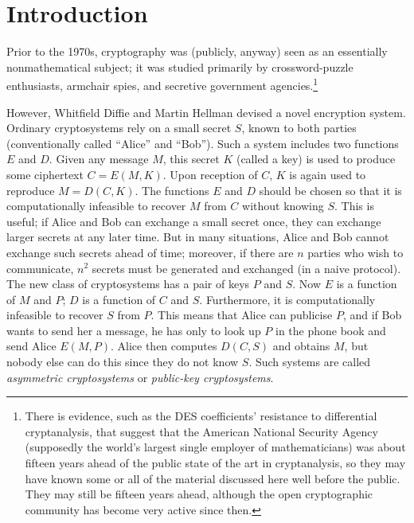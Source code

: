 \documentclass[12pt]{article}
\begin{document}
\section*{Introduction}

Prior to the 1970s, cryptography was (publicly, anyway) seen as an essentially nonmathematical subject; it was studied primarily by crossword-puzzle enthusiasts, armchair spies, and secretive government agencies.\footnote{There is evidence, such as the DES coefficients' resistance to differential cryptanalysis, that suggest that the American National Security Agency (supposedly the world's largest single employer of mathematicians) was about fifteen years ahead of the public state of the art in cryptanalysis, so they may have known some or all of the material discussed here well before the public.  They may still be fifteen years ahead, although the open cryptographic community has become very active since then.} 

However, Whitfield Diffie and Martin Hellman devised a novel encryption system.  Ordinary cryptosystems rely on a small secret $S$, known to both parties (conventionally called ``Alice'' and ``Bob'').  Such a system includes two functions $E$ and $D$.  Given any message $M$, this secret $K$ (called a key) is used to produce some ciphertext $C=E(M,K)$.  Upon reception of $C$, $K$ is again used to reproduce $M=D(C,K)$.  The functions $E$ and $D$ should be chosen so that it is computationally infeasible to recover $M$ from $C$ without knowing $S$.  This is useful; if Alice and Bob can exchange a small secret once, they can exchange larger secrets at any later time.  But in many situations, Alice and Bob cannot exchange such secrets ahead of time; moreover, if there are $n$ parties who wish to communicate, $n^2$ secrets must be generated and exchanged (in a naive protocol).  The new class of cryptosystems has a pair of keys $P$ and $S$.  Now $E$ is a function of $M$ and $P$; $D$ is a function of $C$ and $S$.  Furthermore, it is computationally infeasible to recover $S$ from $P$.  This means that Alice can publicise $P$, and if Bob wants to send her a message, he has only to look up $P$ in the phone book and send Alice $E(M,P)$.  Alice then computes $D(C,S)$ and obtains $M$, but nobody else can do this since they do not know $S$.  Such systems are called \emph{asymmetric cryptosystems} or \emph{public-key cryptosystems}. 
\end{document}
